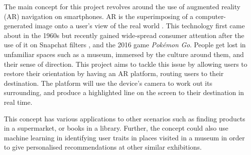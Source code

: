 
The main concept for this project revolves around the use of augmented reality (AR) navigation on smartphones. AR is the superimposing of a computer-generated image onto a user's view of the real world \cite{oxforddict}. This technology first came about in the 1960s \cite{InteractionDesign} but recently gained wide-spread consumer attention after the use of it on Snapchat filters \cite{Snapchat}, and the 2016 game \textit{Pokémon Go}. People get lost in unfamiliar spaces such as a museum, immersed by the culture around them, and their sense of direction. This project aims to tackle this issue by allowing users to restore their orientation by having an AR platform, routing users to their destination. The platform will use the device's camera to work out its surrounding, and produce a highlighted line on the screen to their destination in real time.

This concept has various applications to other scenarios such as finding products in a supermarket, or books in a library. Further, the concept could also use machine learning in identifying user traits in places visited in a museum in order to give personalised recommendations at other similar exhibitions.
